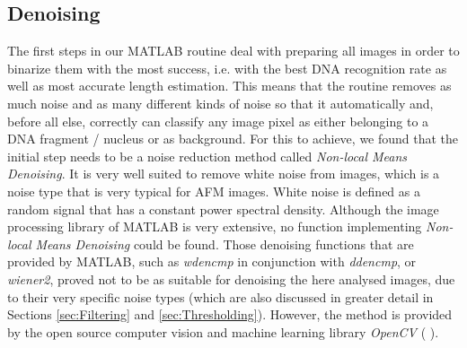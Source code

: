 \documentclass{article}
\begin{document}
\newpage
\subsection{Denoising}\label{sec:Denoising}
The first steps in our MATLAB routine deal with preparing all images in order to binarize them with the most success, i.e. with the best DNA recognition rate as well as most accurate length estimation. This means that the routine removes as much noise and as many different kinds of noise so that it automatically and, before all else, correctly can classify any image pixel as either belonging to a DNA fragment / nucleus or as background.
For this to achieve, we found that the initial step needs to be a noise reduction method called \textit{Non-local Means Denoising}. It is very well suited to remove white noise from images, which is a noise type that is very typical for AFM images. White noise is defined as a random signal that has a constant power spectral density. Although the image processing library of MATLAB is very extensive, no function implementing \textit{Non-local Means Denoising} could be found. Those denoising functions that are provided by MATLAB, such as \textit{wdencmp} in conjunction with \textit{ddencmp}, or \textit{wiener2}, proved not to be as suitable for denoising the here analysed images, due to their very specific noise types (which are also discussed in greater detail in Sections \ref{sec:Filtering} and \ref{sec:Thresholding}). However, the method is provided by the open source computer vision and machine learning library \textit{OpenCV} (\cite{itseez2016opencvman} \cite{itseez2016opencvlib}). 
\end{document}
